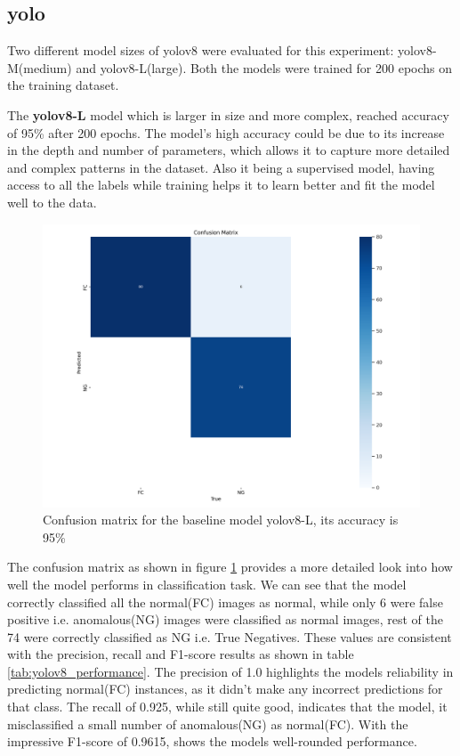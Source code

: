 \subsection*{\gls{yolo}}

Two different model sizes of \gls{yolo}v8 \cite{Ultralytics2024} were evaluated for this experiment: \gls{yolo}v8-M(medium) and \gls{yolo}v8-L(large). Both the models were trained for 200 epochs on the training dataset.

The \textbf{\gls{yolo}v8-L} model which is larger in size and more complex, reached accuracy of 95\% after 200 epochs. The model's high accuracy could be due to its increase in the depth and number of parameters, which allows it to capture more detailed and complex patterns in the dataset. Also it being a supervised model, having access to all the labels while training helps it to learn better and fit the model well to the data.

\begin{figure}
    \centering
    \includegraphics[width=1.3\linewidth]{Rohit_Master_Thesis//Images/yolov8l_confusion_matrix.png}
    \caption{Confusion matrix for the baseline model \gls{yolo}v8-L, its accuracy is 95\%}
    \label{fig:yolov8l confusion matrix}
\end{figure}

The confusion matrix as shown in figure \ref{fig:yolov8l confusion matrix} provides a more detailed look into how well the model performs in classification task. We can see that the model correctly classified all the normal(FC) images as normal, while only 6 were false positive i.e. anomalous(NG) images were classified as normal images, rest of the 74 were correctly classified as NG i.e. True Negatives. These values are consistent with the precision, recall and F1-score results as shown in table \ref{tab:yolov8_performance}. The precision of 1.0 highlights the models reliability in predicting normal(FC) instances, as it didn't make any incorrect predictions for that class. The recall of 0.925, while still quite good, indicates that the model, it misclassified a small number of anomalous(NG) as normal(FC). With the impressive F1-score of 0.9615, shows the models well-rounded performance.


